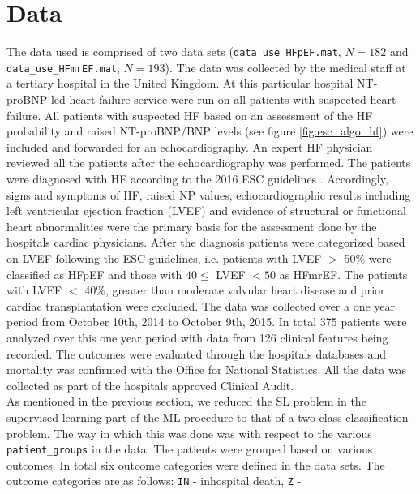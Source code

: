 \documentclass[../thesis.tex]{subfiles}
\begin{document}
\section{Data}
\label{sec:data}

\noindent The data used is comprised of two data sets (\texttt{data\_use\_HFpEF.mat}, $N = 182$ and \texttt{data\_use\_HFmrEF.mat}, $N = 193$). The data was collected by the medical staff at a tertiary hospital in the United Kingdom. At this particular hospital NT-proBNP led heart failure service were run on all patients with suspected heart failure. All patients with suspected HF based on an assessment of the HF probability and raised NT-proBNP/BNP levels (see figure \ref{fig:esc_algo_hf}) were included and forwarded for an echocardiography. An expert HF physician reviewed all the patients after the echocardiography was performed. The patients were diagnosed with HF according to the 2016 ESC guidelines \citep{ponikowski2016}. Accordingly, signs and symptoms of HF, raised NP values, echocardiographic results including left ventricular ejection fraction (LVEF) and evidence of structural or functional heart abnormalities were the primary basis for the assessment done by the hospitals cardiac physicians. After the diagnosis patients were categorized based on LVEF following the ESC guidelines, i.e. patients with LVEF $>$ 50\% were classified as HFpEF and those with $40 \leq$ LVEF $< 50$ as HFmrEF. The patients with LVEF $<$ 40\%, greater than moderate valvular heart disease and prior cardiac transplantation were excluded. The data was collected over a one year period from October 10th, 2014 to October 9th, 2015. In total 375 patients were analyzed over this one year period with data from 126 clinical features being recorded. The outcomes were evaluated through the hospitals databases and mortality was confirmed with the Office for National Statistics. All the data was collected as part of the hospitals approved Clinical Audit.\\
\indent As mentioned in the previous section, we reduced the SL problem in the supervised learning part of the ML procedure to that of a two class classification problem. The way in which this was done was with respect to the various \texttt{patient\_groups} in the data. The patients were grouped based on various outcomes. In total six outcome categories were defined in the data sets. The outcome categories are as follows: \texttt{IN} - inhospital death, \texttt{Z} -


\end{document}
